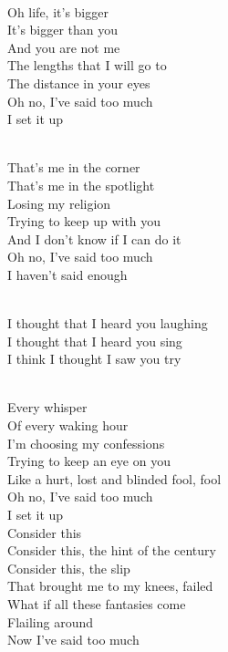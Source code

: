 \begin{multicols}{2}

    {\\
    Oh life, it's bigger\\
    It's bigger than you\\
    And you are not me\\
    The lengths that I will go to\\
    The distance in your eyes\\
    Oh no, I've said too much\\
    I set it up
    }


    {\\
    That's me in the corner\\
    That's me in the spotlight\\
    Losing my religion\\
    Trying to keep up with you\\
    And I don't know if I can do it\\
    Oh no, I've said too much\\
    I haven't said enough
    }

    {\\
    I thought that I heard you laughing\\
    I thought that I heard you sing\\
    I think I thought I saw you try
    }

    {\\
    Every whisper\\
    Of every waking hour\\
    I'm choosing my confessions\\
    Trying to keep an eye on you\\
    Like a hurt, lost and blinded fool, fool\\
    Oh no, I've said too much\\
    I set it up
    }
    {\\
    Consider this\\
    Consider this, the hint of the century\\
    Consider this, the slip\\
    That brought me to my knees, failed\\
    What if all these fantasies come\\
    Flailing around\\
    Now I've said too much\\
    }


\end{multicols}
